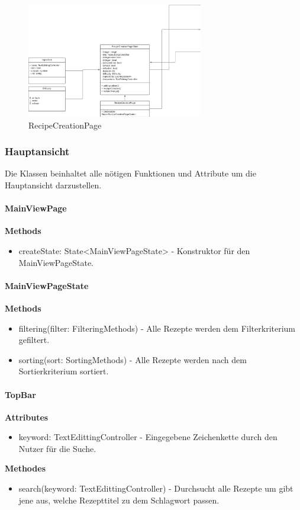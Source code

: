 \documentclass[parskip=full]{scrartcl}
\begin{document}
\begin{figure}[htp]
    \centering
    \includegraphics[height = 50mm]{images/presentationLayer/recipeCreationPage.png}
    \caption{RecipeCreationPage}
\end{figure}


\newpage

\subsubsection{Hauptansicht}
Die Klassen beinhaltet alle nötigen Funktionen und Attribute um die Hauptansicht darzustellen.\newline

\paragraph{MainViewPage}
\textbf{Methods}
\begin{itemize}
    \item createState: State<MainViewPageState> - Konstruktor für den MainViewPageState.
\end{itemize}

\paragraph{MainViewPageState}
\textbf{Methods}
\begin{itemize}
    \item filtering(filter: FilteringMethods) - Alle Rezepte werden dem Filterkriterium gefiltert.
    \item sorting(sort: SortingMethods) - Alle Rezepte werden nach dem Sortierkriterium sortiert.
\end{itemize}

\paragraph{TopBar}
\textbf{Attributes}
\begin{itemize}
    \item keyword: TextEdittingController - Eingegebene Zeichenkette durch den Nutzer für die Suche.
\end{itemize}
\textbf{Methodes}
\begin{itemize}
    \item search(keyword: TextEdittingController) - Durchsucht alle Rezepte um gibt jene aus, welche Rezepttitel zu dem Schlagwort passen.
\end{itemize}
\end{document}
